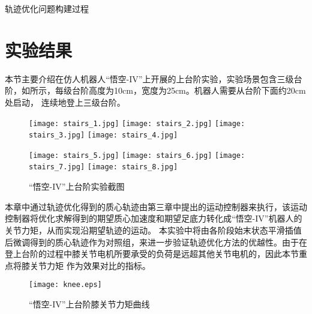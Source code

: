 \begin{algorithm}[h]
\caption{\label{alg:traj_optimization}轨迹优化问题构建过程} 
\end{algorithm}
\section{实验结果}
\label{stair_experiment}
本节主要介绍在仿人机器人“悟空-IV”上开展的上台阶实验，实验场景包含三级台阶，如所示，每级台阶高度为10cm，宽度为25cm。机器人需要从台阶下面约20cm处启动，
连续地登上三级台阶。
\begin{figure}[h]
    \centering
    \texttt{[image: stairs\_1.jpg]}
    \texttt{[image: stairs\_2.jpg]}
    \texttt{[image: stairs\_3.jpg]}
    \texttt{[image: stairs\_4.jpg]}

    \texttt{[image: stairs\_5.jpg]}
    \texttt{[image: stairs\_6.jpg]}
    \texttt{[image: stairs\_7.jpg]}
    \texttt{[image: stairs\_8.jpg]}   
    \caption{\label{fig:stairs}“悟空-IV”上台阶实验截图}
\end{figure}

本章中通过轨迹优化得到的质心轨迹由第三章中提出的运动控制器来执行，该运动控制器将优化求解得到的期望质心加速度和期望足底力转化成“悟空-IV”机器人的关节力矩，从而实现沿期望轨迹的运动。
本实验中将由各阶段始末状态平滑插值后微调得到的质心轨迹作为对照组，来进一步验证轨迹优化方法的优越性。由于在登上台阶的过程中膝关节电机所要承受的负荷是远超其他关节电机的，因此本节重点将膝关节力矩
作为效果对比的指标。
\begin{figure}[h]
    \centering
    \texttt{[image: knee.eps]} 
    \caption{\label{fig:knee_torque}“悟空-IV”上台阶膝关节力矩曲线}
\end{figure}

